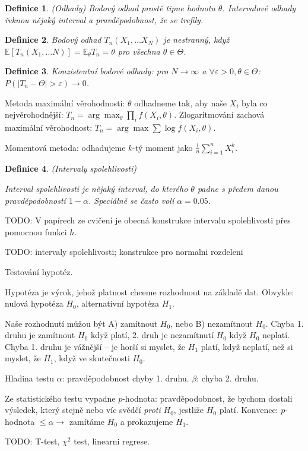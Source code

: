\documentclass[a4paper,10pt,titlepage]{article} \usepackage[utf8]{inputenc}
\newtheorem{define}{Definice}
\begin{document}
\begin{define}(Odhady)
Bodový odhad prostě tipne hodnotu $\theta$. Intervalové odhady řeknou
nějaký interval a pravděpodobnost, že se trefily.
\end{define}

\begin{define}
Bodový odhad $T_n(X_1,\ldots X_N)$ je nestranný, když $\mathbb{E}[T_n(X_1,\ldots
N)]=\mathbb{E}_{\theta}T_n=\theta$ pro všechna $\theta\in\Theta$.
\end{define}

\begin{define}
Konzistentní bodové odhady: pro $N\rightarrow\infty$ a $\forall\varepsilon>0,
\theta\in\Theta$:
$P(|T_n-\Theta|>\varepsilon)\rightarrow 0$.
\end{define}

Metoda maximální věrohodnosti: $\theta$ odhadneme tak, aby naše $X_i$ byla
co nejvěrohodnější: $T_n=\arg\max_\theta \prod_{i} f(X_i,\theta)$.
Zlogaritmování zachová maximální věrohodnost: $T_n=\arg\max\sum\log
f(X_i,\theta)$.

Momentová metoda: odhadujeme $k$-tý moment jako $\frac{1}{n}\sum_{i=1}^n X_i^k$.

\begin{define}(Intervaly spolehlivosti)

Interval spolehlivosti je nějaký interval, do kterého $\theta$ padne
s předem danou pravděpodobností $1-\alpha$. Speciálně se často volí
$\alpha=0.05$.
\end{define}

TODO: V papírech ze cvičení je obecná konstrukce intervalu spolehlivosti
přes pomocnou funkci $h$.

TODO: intervaly spolehlivosti; konstrukce pro normalni rozdeleni

Testování hypotéz.

Hypotéza je výrok, jehož platnost chceme rozhodnout na základě dat.
Obvykle: nulová hypotéza $H_0$, alternativní hypotéza $H_1$.

Naše rozhodnutí můžou být A) zamítnout $H_0$, nebo B) nezamítnout $H_0$.
Chyba 1. druhu je zamítnout $H_0$ když platí, 2. druh je nezamítnutí $H_0$
když $H_0$ neplatí. Chyba 1. druhu je vážnější -- je horší si myslet,
že $H_1$ platí, když neplatí, než si myslet, že $H_1$, když ve skutečnosti
$H_0$.

Hladina testu $\alpha$: pravděpodobnost chyby 1. druhu.
$\beta$: chyba 2. druhu.

Ze statistického testu vypadne $p$-hodnota: pravděpodobnost, že bychom dostali
výsledek, který stejně nebo víc svědčí \emph{proti} $H_0$, jestliže $H_0$ platí.
Konvence: $p$-hodnota $\leq\alpha\longrightarrow$ zamítáme $H_0$ a prokazujeme
$H_1$.

TODO: T-test, $\chi^2$ test, linearni regrese.
\end{document}
